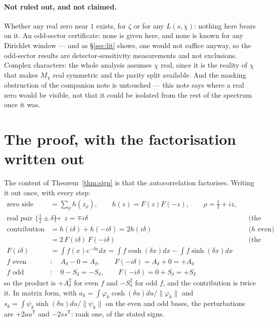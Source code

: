\documentclass[11pt,a4paper]{article}
\theoremstyle{remark}
\newcommand{\Ad}{A_\delta}
\newcommand{\Sd}{S_\delta}
\begin{document}
\paragraph{Not ruled out, and not claimed.} Whether any real zero near $1$ exists, for
$\zeta$ or for any $L(s,\chi)$: nothing here bears on it. An odd-sector certificate: none is
given here, and none is known for any Dirichlet window --- and as \S\ref{sec:lit} shows, one
would not suffice anyway, so the odd-sector results are detector-sensitivity measurements and
not exclusions. Complex characters: the whole analysis
assumes $\chi$ real, since it is the reality of $\chi$ that makes $M_\chi$ real symmetric
and the parity split available. And the masking obstruction of the companion note is
untouched --- this note says where a real zero would be visible, not that it could be
isolated from the rest of the spectrum once it was.

\appendix

\section{The proof, with the factorisation written out}\label{app:proof}

The content of Theorem~\ref{thm:sign} is that the autocorrelation factorises. Writing it
out once, with every step:
\begin{align*}
\text{zero side} &= \sum_\rho h(z_\rho), \qquad h(z)=F(z)F(-z),\qquad \rho=\tfrac12+iz,\\
\text{real pair } \{\tfrac12\pm\delta\} &\ \longrightarrow\ z=\mp i\delta
  &&\text{(the functional equation forces the partner)}\\
\text{contribution} &= h(i\delta)+h(-i\delta)=2h(i\delta)
  &&\text{($h$ even)}\\
 &= 2\,F(i\delta)\,F(-i\delta)
  &&\text{(the factorisation --- the whole content)}\\
F(i\delta) &= \int f(x)e^{-\delta x}dx
  = \int f\cosh(\delta x)dx-\int f\sinh(\delta x)dx\\
f \text{ even} &:\quad \Ad-0=\Ad,\qquad F(-i\delta)=\Ad+0=+\Ad\\
f \text{ odd\ } &:\quad 0-\Sd=-\Sd,\qquad F(-i\delta)=0+\Sd=+\Sd
\end{align*}
so the product is $+\Ad^2$ for even $f$ and $-\Sd^2$ for odd $f$, and the contribution is
twice it. In matrix form, with $a_k=\int\varphi_k\cosh(\delta u)du/\|\varphi_k\|$ and
$s_k=\int\psi_k\sinh(\delta u)du/\|\psi_k\|$ on the even and odd bases, the perturbations
are $+2aa^{\mathsf T}$ and $-2ss^{\mathsf T}$: rank one, of the stated signs.
\end{document}
